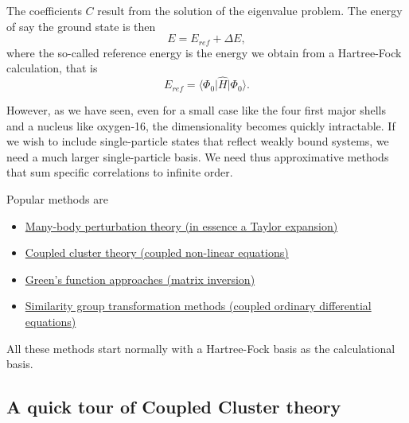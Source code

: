 \documentclass[%
oneside,                 %
final,                   %
10pt]{article}
\begin{document}
The coefficients $C$ result from the solution of the eigenvalue problem. 
The energy of say the ground state is then
\[
E=E_{ref}+\Delta E,
\]
where the so-called reference energy is the energy we obtain from a Hartree-Fock calculation, that is
\[
E_{ref}=\langle \Phi_0 \vert \hat{H} \vert \Phi_0 \rangle.
\]

However, as we have seen, even for a small case like the four first major shells and a nucleus like oxygen-16, the dimensionality becomes quickly intractable. If we wish to include single-particle states that reflect weakly bound systems, we need a much larger single-particle basis. We need thus approximative methods that sum specific correlations to infinite order. 

Popular methods are
\begin{itemize}
\item \href{{http://www.sciencedirect.com/science/journal/03701573/261/3-4}}{Many-body perturbation theory (in essence a Taylor expansion)}

\item \href{{http://iopscience.iop.org/0034-4885/77/9/096302}}{Coupled cluster theory (coupled non-linear equations)}

\item \href{{http://www.worldscientific.com/worldscibooks/10.1142/6821}}{Green's function approaches (matrix inversion)}

\item \href{{http://journals.aps.org/prc/abstract/10.1103/PhysRevC.85.061304}}{Similarity group transformation methods (coupled ordinary differential equations)}
\end{itemize}

\noindent
All these methods start normally with a Hartree-Fock basis as the calculational basis. 


\subsection*{A quick tour of Coupled Cluster theory}
\end{document}
